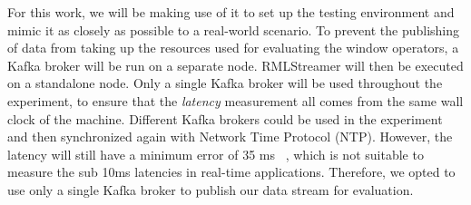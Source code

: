 For this work, we will be making use of it to set up the testing 
environment and mimic it as closely as possible to a real-world scenario. 
To prevent the publishing of data from taking up the resources used for evaluating the 
window operators, a Kafka broker will be run on a separate node. RMLStreamer will then be 
executed on a standalone node. Only a single Kafka broker will be used throughout the experiment, 
to ensure that the \emph{latency} measurement all comes from the same wall clock of the machine. 
Different Kafka brokers could be used in the experiment and then synchronized again 
with Network Time Protocol (NTP). However, the latency will still have a minimum
error of 35 ms~\cite{ntp_latency} ,
which is not suitable to measure the sub 10ms latencies in 
real-time applications. Therefore, we opted to use only a single Kafka broker to publish
our data stream for evaluation.





